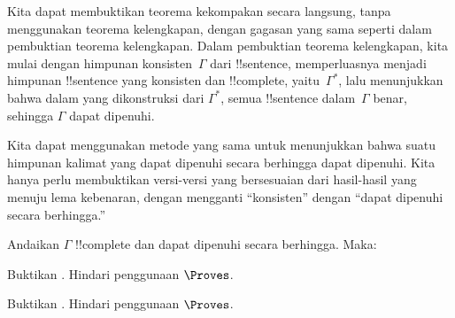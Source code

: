 \documentclass[../../../include/open-logic-section]{subfiles}
\begin{document}
      {}
      {}


Kita dapat membuktikan teorema kekompakan secara langsung, tanpa
menggunakan teorema kelengkapan, dengan gagasan yang sama seperti dalam
pembuktian teorema kelengkapan. Dalam pembuktian teorema kelengkapan,
kita mulai dengan himpunan konsisten~$\Gamma$ dari !!{sentence},
memperluasnya menjadi himpunan !!{sentence} yang
konsisten dan !!{complete}, yaitu~$\Gamma^*$,
lalu menunjukkan bahwa
dalam  yang dikonstruksi dari $\Gamma^*$, semua
!!{sentence} dalam~$\Gamma$ benar, sehingga $\Gamma$ dapat dipenuhi.

Kita dapat menggunakan metode yang sama untuk menunjukkan bahwa suatu
himpunan kalimat yang dapat dipenuhi secara berhingga dapat dipenuhi.
Kita hanya perlu membuktikan versi-versi yang bersesuaian dari
hasil-hasil yang menuju lema kebenaran, dengan mengganti ``konsisten''
dengan ``dapat dipenuhi secara berhingga.''

\begin{prop}
Andaikan $\Gamma$ !!{complete} dan dapat dipenuhi secara berhingga. Maka:
\begin{enumerate}


\end{enumerate}
\end{prop}

\begin{prob}
Buktikan . Hindari penggunaan
$\Proves$.
\end{prob}
\tagendprob

\begin{prob}
Buktikan . Hindari penggunaan
$\Proves$.
\end{prob}
\tagendprob

\end{document}
